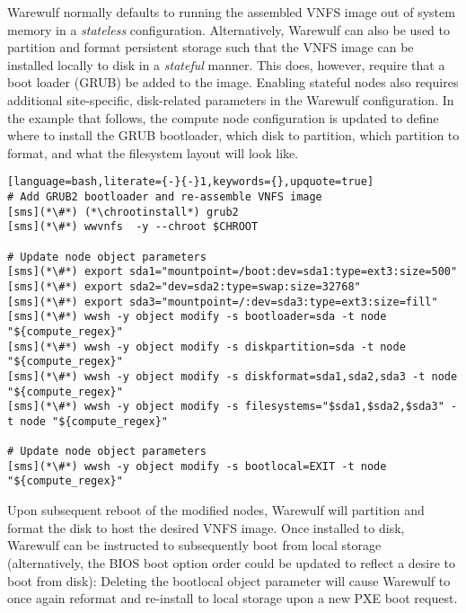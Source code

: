 Warewulf normally defaults to running the assembled VNFS image out of system
memory in a {\em stateless} configuration. Alternatively, Warewulf can also be
used to partition and format persistent storage such that the VNFS image can be
installed locally to disk in a {\em stateful} manner.  This does, however,
require that a boot loader (GRUB) be added to the image. Enabling stateful nodes
also requires additional site-specific, disk-related parameters in the Warewulf
configuration. In the example that follows, the compute node configuration is
updated to define where to install the GRUB bootloader, which disk to partition,
which partition to format, and what the filesystem layout will look like.

\begin{lstlisting}[language=bash,literate={-}{-}1,keywords={},upquote=true]
# Add GRUB2 bootloader and re-assemble VNFS image
[sms](*\#*) (*\chrootinstall*) grub2
[sms](*\#*) wwvnfs  -y --chroot $CHROOT

# Update node object parameters
[sms](*\#*) export sda1="mountpoint=/boot:dev=sda1:type=ext3:size=500"
[sms](*\#*) export sda2="dev=sda2:type=swap:size=32768"
[sms](*\#*) export sda3="mountpoint=/:dev=sda3:type=ext3:size=fill"
[sms](*\#*) wwsh -y object modify -s bootloader=sda -t node "${compute_regex}" 
[sms](*\#*) wwsh -y object modify -s diskpartition=sda -t node "${compute_regex}" 
[sms](*\#*) wwsh -y object modify -s diskformat=sda1,sda2,sda3 -t node "${compute_regex}" 
[sms](*\#*) wwsh -y object modify -s filesystems="$sda1,$sda2,$sda3" -t node "${compute_regex}" 

# Update node object parameters
[sms](*\#*) wwsh -y object modify -s bootlocal=EXIT -t node "${compute_regex}"
\end{lstlisting}

\noindent Upon subsequent reboot of the modified nodes, Warewulf will partition
and format the disk to host the desired VNFS image.  Once installed to disk,
Warewulf can be instructed to subsequently boot from local storage
(alternatively, the BIOS boot option order could be updated to reflect a desire
to boot from disk): Deleting the bootlocal object parameter will cause Warewulf to once
again reformat and re-install to local storage upon a new PXE boot request.
